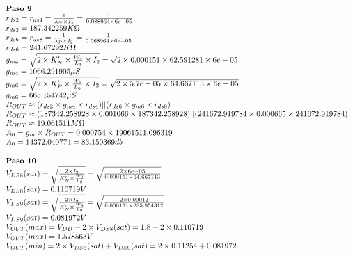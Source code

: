 \begin{equation*}
	\begin{array}{l l}
		\textbf{Paso 9} \\
		r_{ds2} = r_{ds4} = \frac{1}{\lambda_{N}\times I_{2}} = \frac{1}{ 0.088964 \times 6e-05 } \\
		r_{ds2} =  187.342259  K\Omega \\
		r_{ds6} = r_{ds8} = \frac{1}{\lambda_{P}\times I_{2}} = \frac{1}{ 0.068964 \times 6e-05 } \\
		r_{ds6} =  241.67292  K\Omega \\
		g_{m4} = \sqrt{2\times K'_{N}\times \frac{W_4}{L_4}\times I_{2}} = \sqrt{2\times 0.000151 \times 62.591281 \times 6e-05 } \\
		g_{m4} =  1066.291905  \mu S \\
		g_{m6} = \sqrt{2\times K'_{P}\times \frac{W_6}{L_6}\times I_{2}} = \sqrt{2\times 5.7e-05 \times 64.667113 \times 6e-05 } \\
		g_{m6} =  665.154742  \mu S \\
		R_{OUT} \approx (r_{ds2}\times g_{m4}\times r_{ds4})||(r_{ds6}\times g_{m6}\times r_{ds8}) \\
		R_{OUT} \approx ( 187342.258928 \times 0.001066 \times 187342.258928 )||( 241672.919784 \times 0.000665 \times 241672.919784 ) \\
		R_{OUT} \approx  19.061511  M\Omega \\
		A_{0} = g_{m}\times R_{OUT} =  0.000754 \times 19061511.096319  \\
		A_{0} =  14372.040774  =  83.150369  db \\
		\\
		\textbf{Paso 10} \\
		V_{DS8}(sat) = \sqrt{\frac{2\times I_{2}}{K'_{N}\times\frac{W_{8}}{L_{8}}}} = \sqrt{\frac{2\times 6e-05 }{ 0.000151 \times 64.667113 }} \\
		V_{DS8}(sat) =  0.110719  V \\
		V_{DS9}(sat) = \sqrt{\frac{2\times I_{9}}{K'_{N}\times\frac{W_{9}}{L_{9}}}} = \sqrt{\frac{2\times 0.00012 }{ 0.000151 \times 235.954312 }} \\
		V_{DS9}(sat) =  0.081972  V \\
		V_{OUT}(max) = V_{DD} - 2\times V_{DS8}(sat) =  1.8 - 2\times  0.110719  \\
		V_{OUT}(max) =  1.578563  V \\
		V_{OUT}(min) = 2\times V_{DS3}(sat) + V_{DS9}(sat) = 2\times  0.11254  +  0.081972  \\

\end{array}
\end{equation*}

